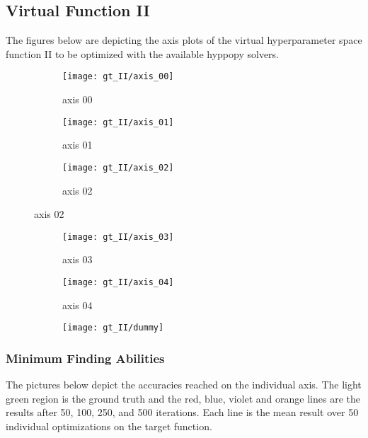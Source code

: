 \subsection{Virtual Function II}
The figures below are depicting the axis plots of the virtual hyperparameter space function II to be optimized with the available hyppopy solvers. 
\begin{figure}[h]
	\begin{subfigure}{0.32\textwidth}
		\texttt{[image: gt\_II/axis\_00]} 
		\caption{axis 00}
		\label{fig:axis00_II}
	\end{subfigure}
	\begin{subfigure}{0.32\textwidth}
		\texttt{[image: gt\_II/axis\_01]}
		\caption{axis 01}
		\label{fig:axis01_II}
	\end{subfigure}
	\begin{subfigure}{0.32\textwidth}
		\texttt{[image: gt\_II/axis\_02]}
		\caption{axis 02}
		\label{fig:axis02_II}
	\end{subfigure}
\end{figure}

\begin{figure}[h]
	\begin{subfigure}{0.32\textwidth}
		\texttt{[image: gt\_II/axis\_03]} 
		\caption{axis 03}
		\label{fig:axis03_II}
	\end{subfigure}
	\begin{subfigure}{0.32\textwidth}
		\texttt{[image: gt\_II/axis\_04]}
		\caption{axis 04}
		\label{fig:axis04_II}
	\end{subfigure}
	\begin{subfigure}{0.32\textwidth}
		\texttt{[image: gt\_II/dummy]}
		\caption{}
		\label{fig:dummy1_II}
	\end{subfigure}
\end{figure}


\newpage


\subsubsection{Minimum Finding Abilities}

The pictures below depict the accuracies reached on the individual axis. The light green region is the ground truth and the red, blue, violet and orange lines are the results after 50, 100, 250, and 500 iterations. Each line is the mean result over 50 individual optimizations on the target function.

